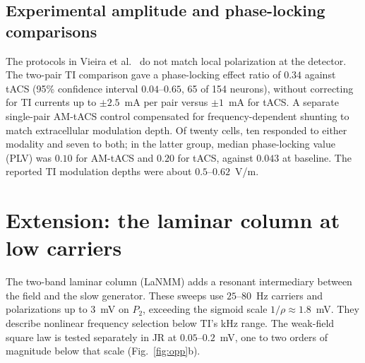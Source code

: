 \documentclass[11pt,a4paper]{article}
\begin{document}
\subsection{Experimental amplitude and phase-locking comparisons}\label{supp:vieira}
The protocols in Vieira et al.\ \cite{vieira2024} do not match local polarization at the detector.
The two-pair TI comparison gave a phase-locking effect ratio of $0.34$ against
tACS (95\% confidence interval $0.04$--$0.65$, 65 of 154 neurons), without
correcting for TI currents up to $\pm2.5$~mA per pair versus $\pm1$~mA for tACS.
A separate single-pair AM-tACS control compensated for frequency-dependent
shunting to match extracellular modulation depth. Of twenty cells, ten responded
to either modality and seven to both; in the latter group, median phase-locking
value (PLV) was $0.10$ for AM-tACS and $0.20$ for tACS, against $0.043$ at baseline.
The reported TI modulation depths were about $0.5$--$0.62$~V/m.


\section{Extension: the laminar column at low carriers}\label{app:lanmm}
The two-band laminar column (LaNMM) adds a resonant intermediary
between the field and the slow generator. These sweeps use $25$--$80$~Hz carriers
and polarizations up to $3$~mV on $P_2$, exceeding the sigmoid scale
$1/\rho\approx1.8$~mV. They describe nonlinear frequency selection below TI's
kHz range. The weak-field square law is tested separately in JR at
$0.05$--$0.2$~mV, one to two orders of magnitude below that scale
(Fig.~\ref{fig:opp}b).
\end{document}
